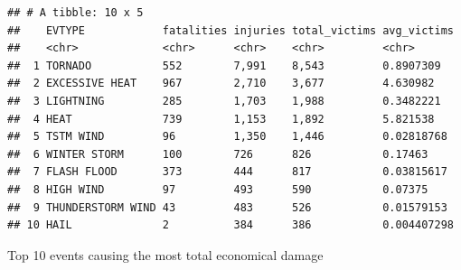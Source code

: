\documentclass[]{article}
\begin{document}
\begin{verbatim}
## # A tibble: 10 x 5
##    EVTYPE            fatalities injuries total_victims avg_victims
##    <chr>             <chr>      <chr>    <chr>         <chr>      
##  1 TORNADO           552        7,991    8,543         0.8907309  
##  2 EXCESSIVE HEAT    967        2,710    3,677         4.630982   
##  3 LIGHTNING         285        1,703    1,988         0.3482221  
##  4 HEAT              739        1,153    1,892         5.821538   
##  5 TSTM WIND         96         1,350    1,446         0.02818768 
##  6 WINTER STORM      100        726      826           0.17463    
##  7 FLASH FLOOD       373        444      817           0.03815617 
##  8 HIGH WIND         97         493      590           0.07375    
##  9 THUNDERSTORM WIND 43         483      526           0.01579153 
## 10 HAIL              2          384      386           0.004407298
\end{verbatim}

Top 10 events causing the most total economical damage
\end{document}
